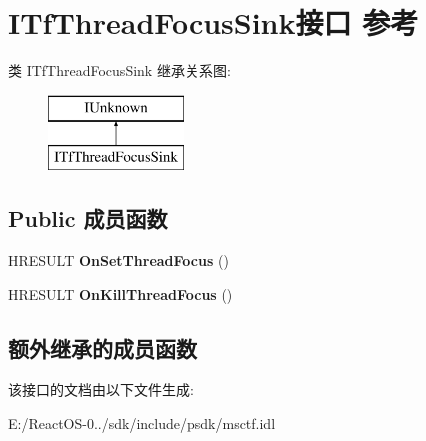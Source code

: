 \hypertarget{interface_i_tf_thread_focus_sink}{}\section{I\+Tf\+Thread\+Focus\+Sink接口 参考}
\label{interface_i_tf_thread_focus_sink}
类 I\+Tf\+Thread\+Focus\+Sink 继承关系图\+:\begin{figure}[H]
\begin{center}
\leavevmode
\includegraphics[height=2.000000cm]{interface_i_tf_thread_focus_sink}
\end{center}
\end{figure}
\subsection*{Public 成员函数}
\begin{DoxyCompactItemize}
\item 
\mbox{\label{interface_i_tf_thread_focus_sink_a970f7f50e2c80b589b9869e382504264}} 
H\+R\+E\+S\+U\+LT {\bfseries On\+Set\+Thread\+Focus} ()
\item 
\mbox{\label{interface_i_tf_thread_focus_sink_a4b67f665e7b3877927255306f167aac7}} 
H\+R\+E\+S\+U\+LT {\bfseries On\+Kill\+Thread\+Focus} ()
\end{DoxyCompactItemize}
\subsection*{额外继承的成员函数}


该接口的文档由以下文件生成\+:\begin{DoxyCompactItemize}
\item 
E\+:/\+React\+O\+S-\/0../sdk/include/psdk/msctf.\+idl\end{DoxyCompactItemize}
